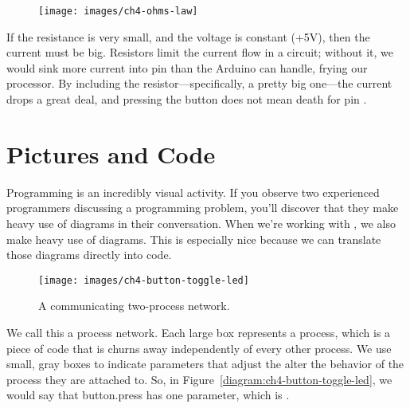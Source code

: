 
\begin{figure}[ht]
  \begin{center}
    \texttt{[image: images/ch4-ohms-law]}
    \label{image:ohms-law}
  \end{center}
\end{figure}

If the resistance is very small, and the voltage is constant ({\code +5V}), then the current must be big. Resistors limit the current flow in a circuit; without it, we would sink more current into pin \pintwo than the Arduino can handle, frying our processor. By including the resistor---specifically, a pretty big one---the current drops a great deal, and pressing the button does not mean death for pin \pintwo.

\newpage

\section{Pictures and Code}

Programming is an incredibly visual activity. If you observe two experienced programmers discussing a programming problem, you'll discover that they make heavy use of diagrams in their conversation. When we're working with \occam, we also make heavy use of diagrams. This is especially nice because we can translate those diagrams directly into code.


\begin{figure}[ht]
  \begin{center}
    \texttt{[image: images/ch4-button-toggle-led]}
    \caption{A communicating two-process network.}
    \label{diagram:ch4-button-toggle-led}
  \end{center}
\end{figure}

We call this a {\strong process network}. Each large box represents a {\strong process}, which is a piece of code that is churns away independently of every other process. We use small, gray boxes to indicate {\strong parameters} that adjust the alter the behavior of the process they are attached to. So, in Figure~\vref{diagram:ch4-button-toggle-led}, we would say that {\code button.press} has one parameter, which is {}. 

